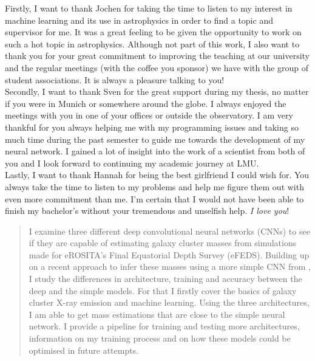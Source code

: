 \documentclass[12pt]{article}
\newcommand\blankpage{%
    \null
    \thispagestyle{empty}%
    \newpage}
\numberwithin{equation}{subsection}
\begin{document}
Firstly, I want to thank Jochen for taking the time to listen to my interest in machine learning and its use in astrophysics in order to find a topic and supervisor for me. It was a great feeling to be given the opportunity to work on such a hot topic in astrophysics. Although not part of this work, I also want to thank you for your great commitment to improving the teaching at our university and the regular meetings (with the coffee you sponsor) we have with the group of student associations. It is always a pleasure talking to you!\\

Secondly, I want to thank Sven for the great support during my thesis, no matter if you were in Munich or somewhere around the globe. I always enjoyed the meetings with you in one of your offices or outside the observatory. I am very thankful for you always helping me with my programming issues and taking so much time during the past semester to guide me towards the development of my neural network. I gained a lot of insight into the work of a scientist from both of you and I look forward to continuing my academic journey at LMU.\\

Lastly, I want to thank Hannah for being the best girlfriend I could wish for. You always take the time to listen to my problems and help me figure them out with even more commitment than me. I'm certain that I would not have been able to finish my bachelor's without your tremendous and unselfish help. \textit{I love you}!
\afterpage{\blankpage}
\newpage

\begin{abstract}

\noindent I examine three different deep convolutional neural networks (CNNs) to see if they are capable of estimating galaxy cluster masses from simulations made for eROSITA's Final Equatorial Depth Survey (eFEDS). Building up on a recent approach to infer these masses using a more simple CNN from \citet{Krippendorf_2023}, I study the differences in architecture, training and accuracy between the deep and the simple models. For that I firstly cover the basics of galaxy cluster X-ray emission and machine learning. Using the three architectures, I am able to get mass estimations that are close to the simple neural network. I provide a pipeline for training and testing more architectures, information on my training process and on how these models could be optimised in future attempts.

\end{abstract}
\end{document}
